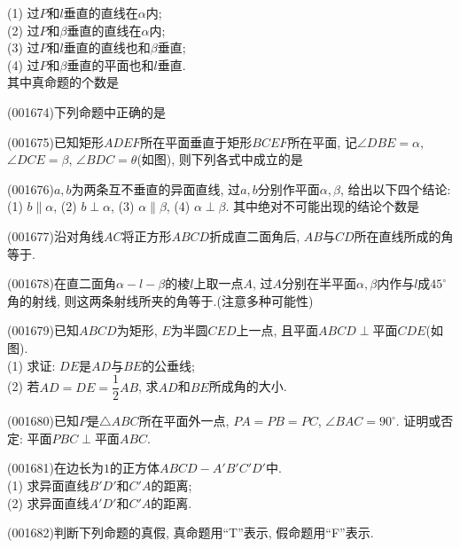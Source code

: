 (1) 过$P$和$l$垂直的直线在$\alpha$内;\\ 
(2) 过$P$和$\beta$垂直的直线在$\alpha$内;\\ 
(3) 过$P$和$l$垂直的直线也和$\beta$垂直;\\ 
(4) 过$P$和$\beta$垂直的平面也和$l$垂直.\\ 
其中真命题的个数是\\ 
\item (001674)下列命题中正确的是
\item (001675)已知矩形$ADEF$所在平面垂直于矩形$BCEF$所在平面, 记$\angle DBE=\alpha$, $\angle DCE=\beta$, $\angle BDC=\theta$(如图), 则下列各式中成立的是
\twoch{$\sin\alpha=\sin\beta\cos\theta$}{$\sin\beta=\sin\alpha\cos\theta$}{$\cos\alpha=\cos\beta\cos\theta$}{$\cos\beta=\cos\alpha\cos\theta$}
\item (001676)$a,b$为两条互不垂直的异面直线, 过$a,b$分别作平面$\alpha,\beta$, 给出以下四个结论: (1) $b\parallel \alpha$, (2) $b\perp \alpha$, (3) $\alpha\parallel\beta$, (4) $\alpha\perp \beta$. 其中绝对不可能出现的结论个数是
\item (001677)沿对角线$AC$将正方形$ABCD$折成直二面角后, $AB$与$CD$所在直线所成的角等于.
\item (001678)在直二面角$\alpha-l-\beta$的棱$l$上取一点$A$, 过$A$分别在半平面$\alpha,\beta$内作与$l$成$45^\circ$角的射线, 则这两条射线所夹的角等于.(注意多种可能性)
\item (001679)已知$ABCD$为矩形, $E$为半圆$CED$上一点, 且平面$ABCD\perp$平面$CDE$(如图).\\ 
(1) 求证: $DE$是$AD$与$BE$的公垂线;\\ 
(2) 若$AD=DE=\dfrac{1}{2}AB$, 求$AD$和$BE$所成角的大小.
\item (001680)已知$P$是$\triangle ABC$所在平面外一点, $PA=PB=PC$, $\angle BAC=90^\circ$. 证明或否定: 平面$PBC\perp$平面$ABC$.
\item (001681)在边长为$1$的正方体$ABCD-A'B'C'D'$中.\\ 
(1) 求异面直线$B'D'$和$C'A$的距离;\\ 
(2) 求异面直线$A'D'$和$C'A$的距离.
\item (001682)判断下列命题的真假, 真命题用``{\textrm T}''表示, 假命题用``{\textrm F}''表示.\\ 
